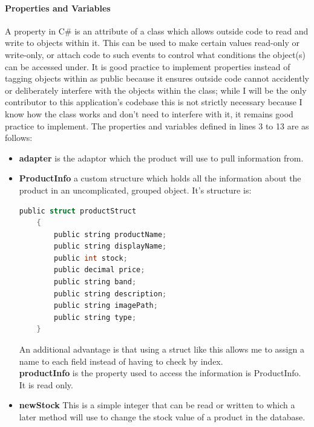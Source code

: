 ﻿\documentclass{article}
\begin{document}
    \paragraph{Properties and Variables}
    A property in C\# is an attribute of a class which allows outside code to read and write to objects within it.
    This can be used to make certain values read-only or write-only, or attach code to such events to control what conditions the object(s) can be accessed under.
    It is good practice to implement properties instead of tagging objects within as public because it ensures outside code cannot accidently or deliberately interfere with the objects within the class; while I will be the only contributor to this application's codebase this is not strictly necessary because I know how the class works and don't need to interfere with it, it remains good practice to implement.
    The properties and variables defined in lines 3 to 13 are as follows:
    \begin{itemize}
        \item \textbf{adapter} is the adaptor which the product will use to pull information from.
        \item \textbf{ProductInfo} a custom structure which holds all the information about the product in an uncomplicated, grouped object.
        It's structure is:
        \begin{lstlisting}[language=C]
    public struct productStruct
    {
        public string productName;
        public string displayName;
        public int stock;
        public decimal price;
        public string band;
        public string description;
        public string imagePath;
        public string type;
    }
        \end{lstlisting}
        An additional advantage is that using a struct like this allows me to assign a name to each field instead of having to check by index.
        \\
        \textbf{productInfo} is the property used to access the information is ProductInfo.
        It is read only.
        \item \textbf{newStock} This is a simple integer that can be read or written to which a later method will use to change the stock value of a product in the database.
    \end{itemize}
\end{document}
